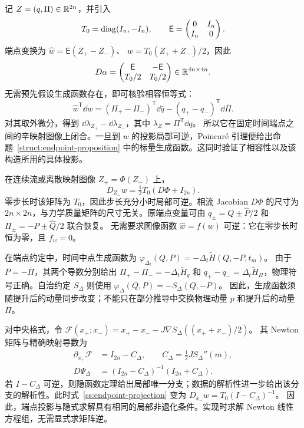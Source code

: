 记 $Z=(q,\Pi)\in\mathbb R^{2n}$，并引入
\[
 T_0=\operatorname{diag}(I_n,-I_n),\qquad
 \mathsf E=\begin{pmatrix}0&I_n\\I_n&0\end{pmatrix}.
\]
端点变换为
$\widehat w=\mathsf E(Z_+-Z_-)$、
$w=T_0(Z_++Z_-)/2$，因此
\begin{equation}\label{ss:endpoint-matrix}
 D\alpha=\begin{pmatrix}
 \mathsf E&-\mathsf E\\T_0/2&T_0/2
 \end{pmatrix}\in\mathbb R^{4n\times4n}.
\end{equation}
无需预先假设生成函数存在，即可核验相容恒等式：
\[
 \widehat w^{\mathsf T}\dd w
 = (\Pi_+-\Pi_-)^{\mathsf T}\dd\bar q
       -(q_+-q_-)^{\mathsf T}\dd\bar\Pi.
\]
对其取外微分，得到
$\dd\lambda_{Z_+}-\dd\lambda_{Z_-}$，其中
$\lambda_Z=\Pi^{\mathsf T}\dd q$。
所以它在固定时间端点之间的辛映射图像上闭合。一旦到 $w$ 的投影局部可逆，Poincar\'e 引理便给出命题~\ref{struct:endpoint-proposition} 中的标量生成函数。这同时验证了相容性以及该构造所用的具体投影。

在连续流或离散映射图像 $Z_+=\Phi(Z_-)$ 上，
\begin{equation}\label{ss:endpoint-projection}
 D_{Z_-}w=\tfrac12T_0(D\Phi+I_{2n}).
\end{equation}
零步长时该矩阵为 $T_0$，因此步长充分小时局部可逆。相流 Jacobian $D\Phi$ 的尺寸为 $2n\times2n$，与力学质量矩阵的尺寸无关。原端点变量可由
$q_\pm=Q\pm\widehat P/2$ 和
$\Pi_\pm=-P\pm\widehat Q/2$ 联合恢复。
无需要求图像函数 $\widehat w=f(w)$ 可逆：它在零步长时恒为零，且 $f_w=0$。

在端点约定中，时间中点生成函数为
$\varphi_{\Delta_t}(Q,P)=-\Delta_t\widetilde H(Q,-P,t_m)$。
由于 $P=-\bar\Pi$，其两个导数分别给出
$\Pi_+-\Pi_-=-\Delta_t\widetilde H_q$ 和
$q_+-q_-=\Delta_t\widetilde H_\Pi$，物理符号正确。自治约定 $S_\Delta$ 则使用
$\varphi_\Delta(Q,P)=-S_\Delta(Q,-P)$。
因此，生成函数须随提升后的动量同步改变；不能只在部分推导中交换物理动量 $p$ 和提升后的动量 $\Pi$。

对中央格式，令
$\mathcal F(x_+;x_-)=x_+-x_--J\nabla S_\Delta((x_++x_-)/2)$。
其 Newton 矩阵与精确映射导数为
\begin{equation}\label{ss:newton-matrix}
\begin{aligned}
 \partial_{x_+}\mathcal F&=I_{2n}-C_\Delta,\qquad
 C_\Delta=\tfrac12J S_\Delta''(m),\\
 D\Psi_\Delta&=(I_{2n}-C_\Delta)^{-1}(I_{2n}+C_\Delta).
\end{aligned}
\end{equation}
若 $I-C_\Delta$ 可逆，则隐函数定理给出局部唯一分支；数据的解析性进一步给出该分支的解析性。此时式~\eqref{ss:endpoint-projection} 变为
$D_{x_-}w=T_0(I-C_\Delta)^{-1}$。
因此，端点投影与隐式求解具有相同的局部非退化条件。实现时求解 Newton 线性方程组，无需显式求矩阵逆。

